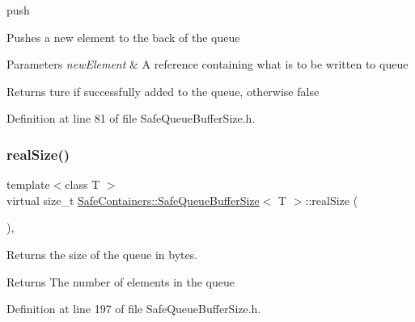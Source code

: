 push 

Pushes a new element to the back of the queue


\begin{DoxyParams}{Parameters}
{\em new\+Element} & A reference containing what is to be written to queue\\
\hline
\end{DoxyParams}
\begin{DoxyReturn}{Returns}
ture if successfully added to the queue, otherwise false 
\end{DoxyReturn}


Definition at line 81 of file Safe\+Queue\+Buffer\+Size.\+h.

\mbox{\label{classSafeContainers_1_1SafeQueueBufferSize_ae046a90a1ac9683f90c21eeaa4be2f37}} 
\subsubsection{\texorpdfstring{realSize()}{realSize()}}
{\footnotesize\ttfamily template$<$class T $>$ \\
virtual size\+\_\+t \mbox{\hyperlink{classSafeContainers_1_1SafeQueueBufferSize}{Safe\+Containers\+::\+Safe\+Queue\+Buffer\+Size}}$<$ T $>$\+::real\+Size (\begin{DoxyParamCaption}{ }\end{DoxyParamCaption})\hspace{0.3cm}{\ttfamily [inline]}, {\ttfamily [virtual]}}



Returns the size of the queue in bytes. 

\begin{DoxyReturn}{Returns}
The number of elements in the queue 
\end{DoxyReturn}


Definition at line 197 of file Safe\+Queue\+Buffer\+Size.\+h.

\mbox{\label{classSafeContainers_1_1SafeQueueBufferSize_a326e5f16d2b178f5065cfef9ebab4d65}} 
